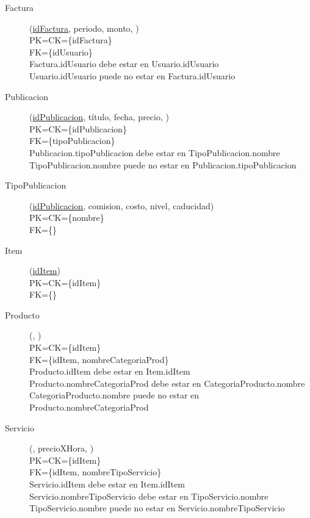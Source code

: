 \begin{description}
 \item[Factura](\underline{idFactura}, periodo, monto, )\\
PK=CK=\{idFactura\}\\
FK=\{idUsuario\}\\
Factura.idUsuario debe estar en Usuario.idUsuario\\
Usuario.idUsuario puede no estar en Factura.idUsuario

 \item[Publicacion](\underline{idPublicacion}, título, fecha, precio, )\\
PK=CK=\{idPublicacion\}\\
FK=\{tipoPublicacion\}\\
Publicacion.tipoPublicacion debe estar en TipoPublicacion.nombre\\
TipoPublicacion.nombre puede no estar en Publicacion.tipoPublicacion

 \item[TipoPublicacion](\underline{idPublicacion}, comision, costo, nivel, caducidad)\\
PK=CK=\{nombre\}\\
FK=\{\}\\

 \item[Item](\underline{idItem})\\
PK=CK=\{idItem\}\\
FK=\{\}\\

 \item[Producto](\underline{}, )\\
PK=CK=\{idItem\}\\
FK=\{idItem, nombreCategoriaProd\}\\
Producto.idItem debe estar en Item.idItem\\
Producto.nombreCategoriaProd debe estar en CategoriaProducto.nombre\\
CategoriaProducto.nombre puede no estar en Producto.nombreCategoriaProd

 \item[Servicio](\underline{}, precioXHora, )\\
PK=CK=\{idItem\}\\
FK=\{idItem, nombreTipoServicio\}\\
Servicio.idItem debe estar en Item.idItem\\
Servicio.nombreTipoServicio debe estar en TipoServicio.nombre\\
TipoServicio.nombre puede no estar en Servicio.nombreTipoServicio


\end{description}
